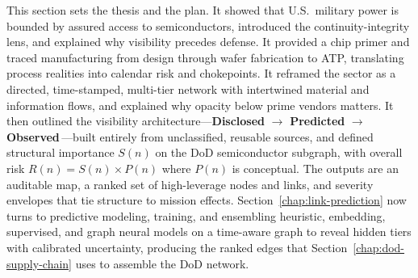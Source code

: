 This section sets the thesis and the plan. It showed that U.S.\ military power is bounded by assured access to semiconductors, introduced the continuity-integrity lens, and explained why visibility precedes defense. It provided a chip primer and traced manufacturing from design through wafer fabrication to ATP, translating process realities into calendar risk and chokepoints. It reframed the sector as a directed, time-stamped, multi-tier network with intertwined material and information flows, and explained why opacity below prime vendors matters. It then outlined the visibility architecture---\textbf{Disclosed} $\rightarrow$ \textbf{Predicted} $\rightarrow$ \textbf{Observed}$\,$---built entirely from unclassified, reusable sources, and defined structural importance \(S(n)\) on the DoD semiconductor subgraph, with overall risk \(R(n)=S(n)\times P(n)\) where \(P(n)\) is conceptual. The outputs are an auditable map, a ranked set of high-leverage nodes and links, and severity envelopes that tie structure to mission effects. Section~\ref{chap:link-prediction} now turns to predictive modeling, training, and ensembling heuristic, embedding, supervised, and graph neural models on a time-aware graph to reveal hidden tiers with calibrated uncertainty, producing the ranked edges that Section~\ref{chap:dod-supply-chain} uses to assemble the DoD network.
